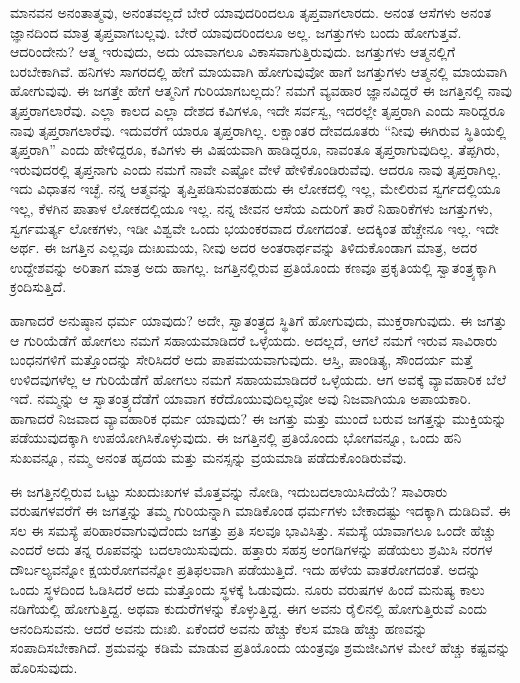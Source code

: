 ಮಾನವನ ಅನಂತಾತ್ಮವು, ಅನಂತವಲ್ಲದೆ ಬೇರೆ ಯಾವುದರಿಂದಲೂ ತೃಪ್ತವಾಗಲಾರದು. ಅನಂತ ಆಸೆಗಳು ಅನಂತ ಜ್ಞಾನದಿಂದ ಮಾತ್ರ ತೃಪ್ತವಾಗಬಲ್ಲವು. ಬೇರೆ ಯಾವುದರಿಂದಲೂ ಅಲ್ಲ. ಜಗತ್ತುಗಳು ಬಂದು ಹೋಗುತ್ತವೆ. ಆದರಿಂದೇನು? ಆತ್ಮ ಇರುವುದು, ಅದು ಯಾವಾಗಲೂ ವಿಕಾಸವಾಗುತ್ತಿರುವುದು. ಜಗತ್ತುಗಳು ಆತ್ಮನಲ್ಲಿಗೆ ಬರಬೇಕಾಗಿವೆ. ಹನಿಗಳು ಸಾಗರದಲ್ಲಿ ಹೇಗೆ ಮಾಯವಾಗಿ ಹೋಗುವುವೋ ಹಾಗೆ ಜಗತ್ತುಗಳು ಆತ್ಮನಲ್ಲಿ ಮಾಯವಾಗಿ ಹೋಗುವುವು. ಈ ಜಗತ್ತೇ ಹೇಗೆ ಆತ್ಮನಿಗೆ ಗುರಿಯಾಗಬಲ್ಲದು? ನಮಗೆ ವ್ಯವಹಾರ ಜ್ಞಾನವಿದ್ದರೆ ಈ ಜಗತ್ತಿನಲ್ಲಿ ನಾವು ತೃಪ್ತರಾಗಲಾರೆವು. ಎಲ್ಲಾ ಕಾಲದ ಎಲ್ಲಾ ದೇಶದ ಕವಿಗಳೂ, ಇದೇ ಸರ್ವಸ್ವ, ಇದರಲ್ಲೇ ತೃಪ್ತರಾಗಿ ಎಂದು ಸಾರಿದ್ದರೂ ನಾವು ತೃಪ್ತರಾಗಲಾರೆವು. ಇದುವರೆಗೆ ಯಾರೂ ತೃಪ್ತರಾಗಿಲ್ಲ. ಲಕ್ಷಾಂತರ ದೇವದೂತರು “ನೀವು ಈಗಿರುವ ಸ್ಥಿತಿಯಲ್ಲಿ ತೃಪ್ತರಾಗಿ” ಎಂದು ಹೇಳಿದ್ದರೂ, ಕವಿಗಳು ಈ ವಿಷಯವಾಗಿ ಹಾಡಿದ್ದರೂ, ನಾವಂತೂ ತೃಪ್ತರಾಗುವುದಿಲ್ಲ. ತೆಪ್ಪಗಿರು, ಇರುವುದರಲ್ಲಿ ತೃಪ್ತನಾಗು ಎಂದು ನಮಗೆ ನಾವೇ ಎಷ್ಟೋ ವೇಳೆ ಹೇಳಿಕೊಂಡಿರುವೆವು. ಆದರೂ ನಾವು ತೃಪ್ತರಾಗಿಲ್ಲ. ಇದು ವಿಧಾತನ ಇಚ್ಛೆ. ನನ್ನ ಆತ್ಮವನ್ನು ತೃಪ್ತಿಪಡಿಸುವಂತಹುದು ಈ ಲೋಕದಲ್ಲಿ ಇಲ್ಲ, ಮೇಲಿರುವ ಸ್ವರ್ಗದಲ್ಲಿಯೂ ಇಲ್ಲ, ಕೆಳಗಿನ ಪಾತಾಳ ಲೋಕದಲ್ಲಿಯೂ ಇಲ್ಲ. ನನ್ನ ಜೀವನ ಆಸೆಯ ಎದುರಿಗೆ ತಾರೆ ನಿಹಾರಿಕೆಗಳು ಜಗತ್ತುಗಳು, ಸ್ವರ್ಗಮರ್ತ್ಯ ಲೋಕಗಳು, ಇಡೀ ವಿಶ್ವವೇ ಒಂದು ಭಯಂಕರವಾದ ರೋಗದಂತೆ. ಅದಕ್ಕಿಂತ ಹೆಚ್ಚೇನೂ ಇಲ್ಲ. ಇದೇ ಅರ್ಥ. ಈ ಜಗತ್ತಿನ ಎಲ್ಲವೂ ದುಃಖಮಯ, ನೀವು ಅದರ ಅಂತರಾರ್ಥವನ್ನು ತಿಳಿದುಕೊಂಡಾಗ ಮಾತ್ರ, ಅದರ ಉದ್ದೇಶವನ್ನು ಅರಿತಾಗ ಮಾತ್ರ ಅದು ಹಾಗಲ್ಲ. ಜಗತ್ತಿನಲ್ಲಿರುವ ಪ್ರತಿಯೊಂದು ಕಣವೂ ಪ್ರಕೃತಿಯಲ್ಲಿ ಸ್ವಾತಂತ್ರ್ಯಕ್ಕಾಗಿ ಕ್ರಂದಿಸುತ್ತಿದೆ.

ಹಾಗಾದರೆ ಅನುಷ್ಠಾನ ಧರ್ಮ ಯಾವುದು? ಅದೇ, ಸ್ವಾತಂತ್ರ್ಯದ ಸ್ಥಿತಿಗೆ ಹೋಗುವುದು, ಮುಕ್ತರಾಗುವುದು. ಈ ಜಗತ್ತು ಆ ಗುರಿಯೆಡೆಗೆ ಹೋಗಲು ನಮಗೆ ಸಹಾಯಮಾಡಿದರೆ ಒಳ್ಳೆಯದು. ಅದಲ್ಲದೆ, ಆಗಲೆ ನಮಗೆ ಇರುವ ಸಾವಿರಾರು ಬಂಧನಗಳಿಗೆ ಮತ್ತೊಂದನ್ನು ಸೇರಿಸಿದರೆ ಅದು ಪಾಪಮಯವಾಗುವುದು. ಆಸ್ತಿ, ಪಾಂಡಿತ್ಯ, ಸೌಂದರ್ಯ ಮತ್ತೆ ಉಳಿದವುಗಳೆಲ್ಲ ಆ ಗುರಿಯೆಡೆಗೆ ಹೋಗಲು ನಮಗೆ ಸಹಾಯಮಾಡಿದರೆ ಒಳ್ಳೆಯದು. ಆಗ ಅವಕ್ಕೆ ವ್ಯಾವಹಾರಿಕ ಬೆಲೆ ಇದೆ. ನಮ್ಮನ್ನು ಆ ಸ್ವಾತಂತ್ರ್ಯದೆಡೆಗೆ ಯಾವಾಗ ಕರೆದೊಯುವುದಿಲ್ಲವೋ ಅವು ನಿಜವಾಗಿಯೂ ಅಪಾಯಕಾರಿ. ಹಾಗಾದರೆ ನಿಜವಾದ ವ್ಯಾವಹಾರಿಕ ಧರ್ಮ ಯಾವುದು? ಈ ಜಗತ್ತು ಮತ್ತು ಮುಂದೆ ಬರುವ ಜಗತ್ತನ್ನು ಮುಕ್ತಿಯನ್ನು ಪಡೆಯುವುದಕ್ಕಾಗಿ ಉಪಯೋಗಿಸಿಕೊಳ್ಳುವುದು. ಈ ಜಗತ್ತಿನಲ್ಲಿ ಪ್ರತಿಯೊಂದು ಭೋಗವನ್ನೂ, ಒಂದು ಹನಿ ಸುಖವನ್ನೂ, ನಮ್ಮ ಅನಂತ ಹೃದಯ ಮತ್ತು ಮನಸ್ಸನ್ನು ವ್ರಯಮಾಡಿ ಪಡೆದುಕೊಂಡಿರುವೆವು.

ಈ ಜಗತ್ತಿನಲ್ಲಿರುವ ಒಟ್ಟು ಸುಖದುಃಖಗಳ ಮೊತ್ತವನ್ನು ನೋಡಿ, ಇದು\break ಬದಲಾಯಿಸಿದೆಯೆ? ಸಾವಿರಾರು ವರುಷಗಳವರೆಗೆ ಈ ಜಗತ್ತನ್ನು ತಮ್ಮ ಗುರಿಯನ್ನಾಗಿ ಮಾಡಿಕೊಂಡ ಧರ್ಮಗಳು ಬೇಕಾದಷ್ಟು ಇದಕ್ಕಾಗಿ ದುಡಿದಿವೆ. ಈ ಸಲ ಈ ಸಮಸ್ಯೆ ಪರಿಹಾರವಾಗುವುದೆಂದು ಜಗತ್ತು ಪ್ರತಿ ಸಲವೂ ಭಾವಿಸಿತ್ತು. ಸಮಸ್ಯೆ ಯಾವಾಗಲೂ ಒಂದೇ ಹೆಚ್ಚು ಎಂದರೆ ಅದು ತನ್ನ ರೂಪವನ್ನು ಬದಲಾಯಿಸುವುದು. ಹತ್ತಾರು ಸಹಸ್ರ ಅಂಗಡಿಗಳನ್ನು ಪಡೆಯಲು ಶ್ರಮಿಸಿ ನರಗಳ ದೌರ್ಬಲ್ಯವನ್ನೋ ಕ್ಷಯರೋಗವನ್ನೋ ಪ್ರತಿಫಲವಾಗಿ ಪಡೆಯುತ್ತಿದೆ. ಇದು ಹಳೆಯ ವಾತರೋಗದಂತೆ. ಅದನ್ನು ಒಂದು ಸ್ಥಳದಿಂದ ಓಡಿಸಿದರೆ ಅದು ಮತ್ತೊಂದು ಸ್ಥಳಕ್ಕೆ ಓಡುವುದು. ನೂರು ವರುಷಗಳ ಹಿಂದೆ ಮನುಷ್ಯ ಕಾಲು ನಡಿಗೆಯಲ್ಲಿ ಹೋಗುತ್ತಿದ್ದ. ಅಥವಾ ಕುದುರೆಗಳನ್ನು ಕೊಳ್ಳುತ್ತಿದ್ದ. ಈಗ ಅವನು ರೈಲಿನಲ್ಲಿ ಹೋಗುತ್ತಿರುವೆ ಎಂದು ಆನಂದಿಸುವನು. ಆದರೆ ಅವನು ದುಃಖಿ. ಏಕೆಂದರೆ ಅವನು ಹೆಚ್ಚು ಕೆಲಸ ಮಾಡಿ ಹೆಚ್ಚು ಹಣವನ್ನು ಸಂಪಾದಿಸಬೇಕಾಗಿದೆ. ಶ್ರಮವನ್ನು ಕಡಿಮೆ ಮಾಡುವ ಪ್ರತಿಯೊಂದು ಯಂತ್ರವೂ ಶ್ರಮಜೀವಿಗಳ ಮೇಲೆ ಹೆಚ್ಚು ಕಷ್ಟವನ್ನು ಹೊರಿಸುವುದು.


